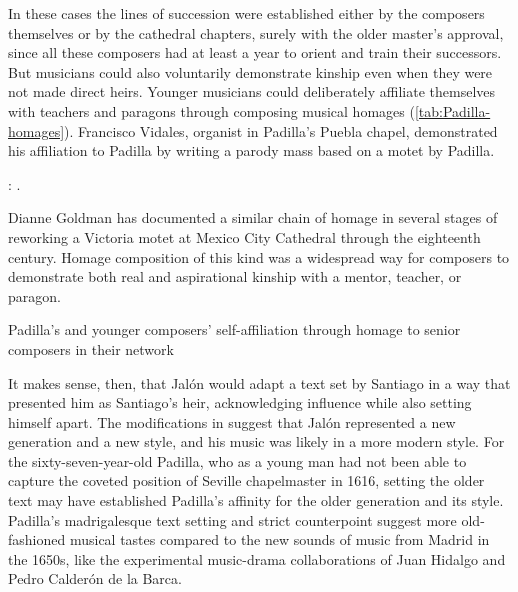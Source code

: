 In these cases the lines of succession were established either by the composers
themselves or by the cathedral chapters, surely with the older master's
approval, since all these composers had at least a year to orient and train
their successors.
But musicians could also voluntarily demonstrate kinship even when they were not
made direct heirs. 
Younger musicians could deliberately affiliate themselves with teachers and
paragons through composing musical homages (\cref{tab:Padilla-homages}).
Francisco Vidales, organist in Padilla's Puebla chapel, demonstrated his
affiliation to Padilla by writing a parody mass based on a motet by Padilla.%
\begin{Footnote}
    \Autocite{Koegel:Padilla}: .
\end{Footnote}
Dianne Goldman has documented a similar chain of homage in several stages of
reworking a Victoria motet at Mexico City Cathedral through the eighteenth
century.%
    \Autocite{Goldman:StileAntico}
Homage composition of this kind was a widespread way for composers to
demonstrate both real and aspirational kinship with a mentor, teacher, or
paragon.

\begin{table}
    \caption{Padilla's  and younger composers' self-affiliation
    through homage to senior composers in their network}
  
    \label{tab:Padilla-homages}

\end{table}

It makes sense, then, that Jalón would adapt a text set by Santiago in a way
that presented him as Santiago's heir, acknowledging influence while also
setting himself apart.
The modifications in  suggest that Jalón
represented a new generation and a new style, and his music was likely in a more
modern style.
For the sixty-seven-year-old Padilla, who as a young man had not been able to
capture the coveted position of Seville chapelmaster in 1616, setting the older
text may have established Padilla's affinity for the older generation and its
style.
Padilla's madrigalesque text setting and strict counterpoint suggest more
old-fashioned musical tastes compared to the new sounds of music from Madrid in
the 1650s, like the experimental music-drama collaborations of Juan Hidalgo and
Pedro Calderón de la Barca.%
    \Autocite{Stein:Songs}


